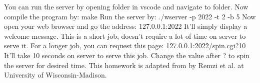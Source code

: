 {}\markdownRendererInterblockSeparator
{}You can run the server by opening folder in vscode and navigate to  folder. Now compile the program by:\markdownRendererInterblockSeparator
{}make\markdownRendererInterblockSeparator
{}Run the server by:\markdownRendererInterblockSeparator
{}./wserver -p 2022 -t 2 -b 5\markdownRendererInterblockSeparator
{}Now open your web browser and go the address:\markdownRendererInterblockSeparator
{}127.0.0.1:2022\markdownRendererInterblockSeparator
{}It'll simply display a welcome message. This is a short job, doesn't require a lot of time on server to serve it. For a longer job, you can request this page:\markdownRendererInterblockSeparator
{}127.0.0.1:2022/spin.cgi?10\markdownRendererInterblockSeparator
{}It'll take 10 seconds on server to serve this job. Change the value after ? to spin the server for desired time.\markdownRendererInterblockSeparator
{}\markdownRendererInterblockSeparator
{}This homework is adapted from  by Remzi et al. at University of Wisconsin-Madison.\markdownRendererDocumentEnd
